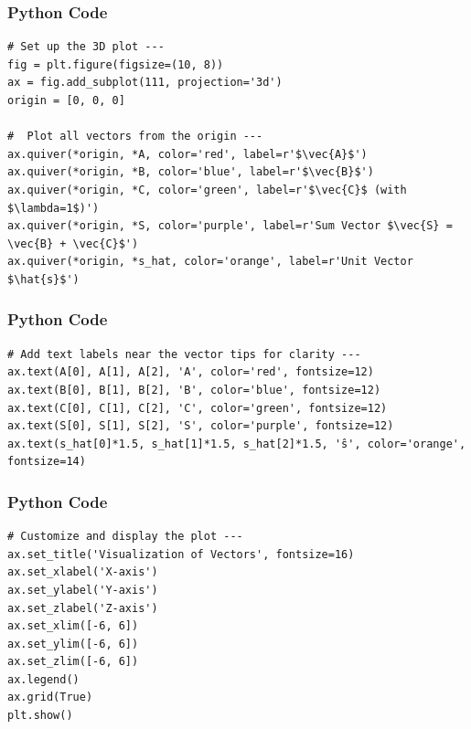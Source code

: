 \documentclass{beamer}
\begin{document}
\begin{frame}[fragile]
    \frametitle{Python Code}

    \begin{lstlisting}
# Set up the 3D plot ---
fig = plt.figure(figsize=(10, 8))
ax = fig.add_subplot(111, projection='3d')
origin = [0, 0, 0]

#  Plot all vectors from the origin ---
ax.quiver(*origin, *A, color='red', label=r'$\vec{A}$')
ax.quiver(*origin, *B, color='blue', label=r'$\vec{B}$')
ax.quiver(*origin, *C, color='green', label=r'$\vec{C}$ (with $\lambda=1$)')
ax.quiver(*origin, *S, color='purple', label=r'Sum Vector $\vec{S} = \vec{B} + \vec{C}$')
ax.quiver(*origin, *s_hat, color='orange', label=r'Unit Vector $\hat{s}$')

    \end{lstlisting}
\end{frame}

\begin{frame}[fragile]
    \frametitle{Python Code}

    \begin{lstlisting}
# Add text labels near the vector tips for clarity ---
ax.text(A[0], A[1], A[2], 'A', color='red', fontsize=12)
ax.text(B[0], B[1], B[2], 'B', color='blue', fontsize=12)
ax.text(C[0], C[1], C[2], 'C', color='green', fontsize=12)
ax.text(S[0], S[1], S[2], 'S', color='purple', fontsize=12)
ax.text(s_hat[0]*1.5, s_hat[1]*1.5, s_hat[2]*1.5, 'ŝ', color='orange', fontsize=14)
\end{lstlisting}
\end{frame}

 
\begin{frame}[fragile]
    \frametitle{Python Code}

    \begin{lstlisting}
# Customize and display the plot ---
ax.set_title('Visualization of Vectors', fontsize=16)
ax.set_xlabel('X-axis')
ax.set_ylabel('Y-axis')
ax.set_zlabel('Z-axis')
ax.set_xlim([-6, 6])
ax.set_ylim([-6, 6])
ax.set_zlim([-6, 6])
ax.legend()
ax.grid(True)
plt.show()
\end{lstlisting}
\end{frame}
\end{document}
